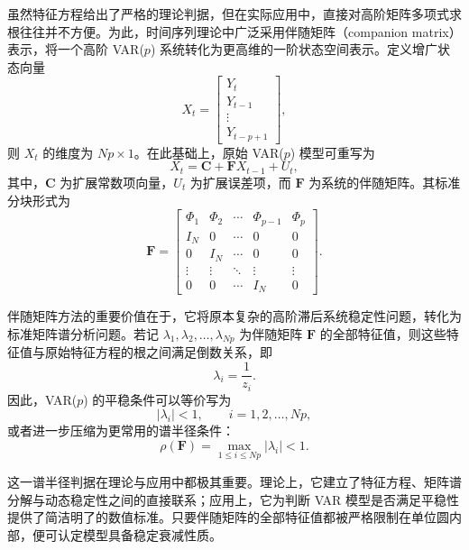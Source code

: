 虽然特征方程给出了严格的理论判据，但在实际应用中，直接对高阶矩阵多项式求根往往并不方便。为此，时间序列理论中广泛采用伴随矩阵（companion matrix）表示，将一个高阶 VAR($p$) 系统转化为更高维的一阶状态空间表示。定义增广状态向量
\begin{equation}
X_t=
\begin{bmatrix}
Y_t\\
Y_{t-1}\\
\vdots\\
Y_{t-p+1}
\end{bmatrix},
\end{equation}
则 $X_t$ 的维度为 $Np\times 1$。在此基础上，原始 VAR($p$) 模型可重写为
\begin{equation}
X_t = \mathbf{C} + \mathbf{F}X_{t-1} + U_t,
\end{equation}
其中，$\mathbf{C}$ 为扩展常数项向量，$U_t$ 为扩展误差项，而 $\mathbf{F}$ 为系统的伴随矩阵。其标准分块形式为
\begin{equation}
\mathbf{F}=
\begin{bmatrix}
\Phi_1 & \Phi_2 & \cdots & \Phi_{p-1} & \Phi_p\\
I_N & 0 & \cdots & 0 & 0\\
0 & I_N & \cdots & 0 & 0\\
\vdots & \vdots & \ddots & \vdots & \vdots\\
0 & 0 & \cdots & I_N & 0
\end{bmatrix}.
\end{equation}

伴随矩阵方法的重要价值在于，它将原本复杂的高阶滞后系统稳定性问题，转化为标准矩阵谱分析问题。若记 $\lambda_1,\lambda_2,\dots,\lambda_{Np}$ 为伴随矩阵 $\mathbf{F}$ 的全部特征值，则这些特征值与原始特征方程的根之间满足倒数关系，即
\begin{equation}
\lambda_i = \frac{1}{z_i}.
\end{equation}
因此，VAR($p$) 的平稳条件可以等价写为
\begin{equation}
|\lambda_i|<1, \qquad i=1,2,\dots,Np,
\end{equation}
或者进一步压缩为更常用的谱半径条件：
\begin{equation}
\rho(\mathbf{F})=\max_{1\leq i\leq Np}|\lambda_i|<1.
\end{equation}

这一谱半径判据在理论与应用中都极其重要。理论上，它建立了特征方程、矩阵谱分解与动态稳定性之间的直接联系；应用上，它为判断 VAR 模型是否满足平稳性提供了简洁明了的数值标准。只要伴随矩阵的全部特征值都被严格限制在单位圆内部，便可认定模型具备稳定衰减性质。

